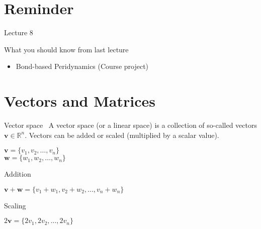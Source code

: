 \documentclass[\classoption]{beamer}
\title{\coursename}
\subtitle{Lecture 9: Linear algebra with Blaze}
\author{\tiny Patrick Diehl \orcid{0000-0003-3922-8419}}
\date {
 \tiny \url{\courseurl}
\vspace{2cm}
\doclicenseThis  
  
}
\begin{document}
 {
    \frame {
        \titlepage
    }
}

\frame{

\tableofcontents

}


\section{Reminder}
\begin{frame}{Lecture 8}
\begin{block}{What you should know from last lecture}
\begin{itemize}
\item Bond-based Peridynamics (Course project)
\end{itemize}
\end{block}
\end{frame}

\section{Vectors and Matrices}


\begin{frame}{Vector space~\cite{hefferonlinear,scheick1997linear}}
A vector space (or a linear space) is a collection of so-called vectors $\mathbf{v}\in \mathbb{R}^n$. Vectors can be added or scaled (multiplied by a scalar value).

\begin{center}
$\mathbf{v} = \lbrace v_1,v_2,\ldots,v_n \rbrace $ \\
$\mathbf{w} = \lbrace w_1,w_2,\ldots,w_n \rbrace $
\end{center}

\begin{block}{Addition}
\begin{center}
$\mathbf{v} + \mathbf{w} = \lbrace v_1+w_1,v_2+w_2,\ldots,v_n+w_n \rbrace $
\end{center}
\end{block}

\begin{block}{Scaling}
\begin{center}
$ 2 \mathbf{v} = \lbrace 2v_1,2v_2,\ldots,2v_n \rbrace $
\end{center}
\end{block}

\end{frame}
\end{document}
